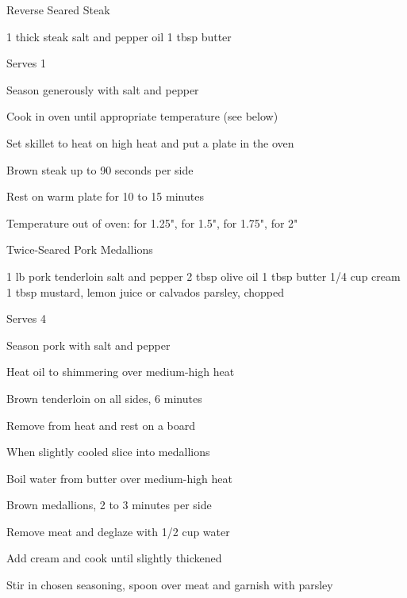 \begin{recipe}{Reverse Seared Steak}{}
\begin{ingredients}
1 thick steak
salt and pepper
oil
1 tbsp butter
\end{ingredients}
\nextcolumn
Serves 1
\begin{steps}
    \item Season generously with salt and pepper
    \item Cook in  oven until appropriate temperature (see below)
    \item Set skillet to heat on high heat and put a plate in the oven
    \item Brown steak up to 90 seconds per side
    \item Rest on warm plate for 10 to 15 minutes
\end{steps}
Temperature out of oven:  for 1.25",  for 1.5",  for 1.75",  for 2"
\end{recipe}

\begin{denserecipe}{Twice-Seared Pork Medallions}{}
\begin{ingredients}
1 lb pork tenderloin
salt and pepper
2 tbsp olive oil
1 tbsp butter
1/4 cup cream
1 tbsp mustard, lemon juice or calvados
parsley, chopped
\end{ingredients}
\nextcolumn
Serves 4
\begin{steps}
    \item Season pork with salt and pepper
    \item Heat oil to shimmering over medium-high heat
    \item Brown tenderloin on all sides, 6 minutes
    \item Remove from heat and rest on a board
    \item When slightly cooled slice into medallions
    \item Boil water from butter over medium-high heat
    \item Brown medallions, 2 to 3 minutes per side
    \item Remove meat and deglaze with 1/2 cup water
    \item Add cream and cook until slightly thickened
    \item Stir in chosen seasoning, spoon over meat and garnish with parsley
\end{steps}
\end{denserecipe}

